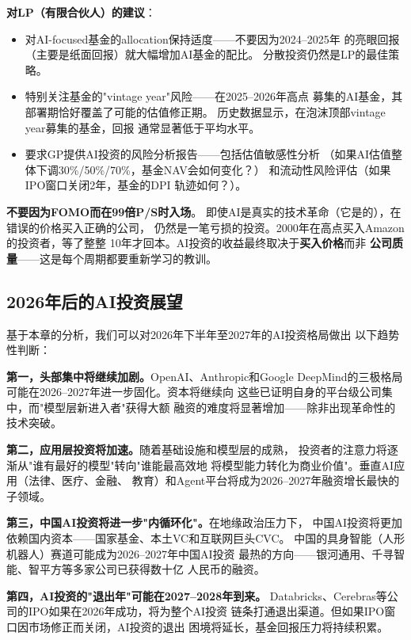 \textbf{对LP（有限合伙人）的建议}：
\begin{itemize}
  \item 对AI-focused基金的allocation保持适度——不要因为2024--2025年
    的亮眼回报（主要是纸面回报）就大幅增加AI基金的配比。
    分散投资仍然是LP的最佳策略。
  \item 特别关注基金的"vintage year"风险——在2025--2026年高点
    募集的AI基金，其部署期恰好覆盖了可能的估值修正期。
    历史数据显示，在泡沫顶部vintage year募集的基金，回报
    通常显著低于平均水平。
  \item 要求GP提供AI投资的风险分析报告——包括估值敏感性分析
    （如果AI估值整体下调30\%/50\%/70\%，基金NAV会如何变化？）
    和流动性风险评估（如果IPO窗口关闭2年，基金的DPI
    轨迹如何？）。
\end{itemize}

\textbf{不要因为FOMO而在99倍P/S时入场}。
即使AI是真实的技术革命（它是的），在错误的价格买入正确的公司，
仍然是一笔亏损的投资。2000年在高点买入Amazon的投资者，等了整整
10年才回本。AI投资的收益最终取决于\textbf{买入价格}而非
\textbf{公司质量}——这是每个周期都要重新学习的教训。

\subsection{2026年后的AI投资展望}
\label{subsec:fund-outlook}

基于本章的分析，我们可以对2026年下半年至2027年的AI投资格局做出
以下趋势性判断：

\textbf{第一，头部集中将继续加剧。}OpenAI、Anthropic和Google
DeepMind的三极格局可能在2026--2027年进一步固化。资本将继续向
这些已证明自身的平台级公司集中，而"模型层新进入者"获得大额
融资的难度将显著增加——除非出现革命性的技术突破。

\textbf{第二，应用层投资将加速。}随着基础设施和模型层的成熟，
投资者的注意力将逐渐从"谁有最好的模型"转向"谁能最高效地
将模型能力转化为商业价值"。垂直AI应用（法律、医疗、金融、
教育）和Agent平台将成为2026--2027年融资增长最快的子领域。

\textbf{第三，中国AI投资将进一步"内循环化"。}在地缘政治压力下，
中国AI投资将更加依赖国内资本——国家基金、本土VC和互联网巨头CVC。
中国的具身智能（人形机器人）赛道可能成为2026--2027年中国AI投资
最热的方向——银河通用、千寻智能、智平方等多家公司已获得数十亿
人民币的融资。

\textbf{第四，AI投资的"退出年"可能在2027--2028年到来。}
Databricks、Cerebras等公司的IPO如果在2026年成功，将为整个AI投资
链条打通退出渠道。但如果IPO窗口因市场修正而关闭，AI投资的退出
困境将延长，基金回报压力将持续积累。

